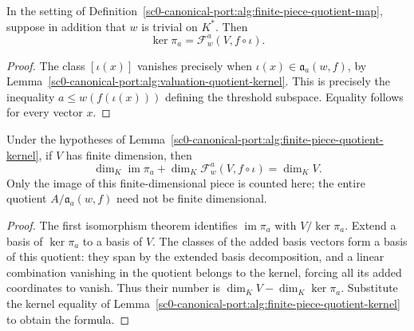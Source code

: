\begin{lemma}
\label{sc0-canonical-port:alg:finite-piece-quotient-kernel}
\leanok
In the setting of Definition~\ref{sc0-canonical-port:alg:finite-piece-quotient-map},
suppose in addition that \(w\) is trivial on \(K^*\). Then
\[
 \ker\pi_a=\mathcal F^a_w(V,f\circ\iota).
\]
\end{lemma}
\begin{proof}
The class \([\iota(x)]\) vanishes precisely when
\(\iota(x)\in\mathfrak a_a(w,f)\), by
Lemma~\ref{sc0-canonical-port:alg:valuation-quotient-kernel}. This is precisely the
inequality \(a\leq w(f(\iota(x)))\) defining the threshold
subspace. Equality follows for every vector \(x\).
\end{proof}

\begin{lemma}
\label{sc0-canonical-port:alg:finite-piece-rank-nullity}
\leanok
Under the hypotheses of Lemma~\ref{sc0-canonical-port:alg:finite-piece-quotient-kernel},
if \(V\) has finite dimension, then
\[
 \dim_K\operatorname{im}\pi_a
 +\dim_K\mathcal F^a_w(V,f\circ\iota)=\dim_K V.
\]
Only the image of this finite-dimensional piece is counted here;
the entire quotient \(A/\mathfrak a_a(w,f)\) need not be finite
 dimensional.
\end{lemma}
\begin{proof}
The first isomorphism theorem identifies
\(\operatorname{im}\pi_a\) with \(V/\ker\pi_a\).
Extend a basis of \(\ker\pi_a\) to a basis of \(V\).
The classes of the added basis vectors form a basis of this
quotient: they span by the extended basis decomposition, and a
linear combination vanishing in the quotient belongs to the kernel,
forcing all its added coordinates to vanish. Thus their number is
\(\dim_K V-\dim_K\ker\pi_a\). Substitute the kernel equality of
Lemma~\ref{sc0-canonical-port:alg:finite-piece-quotient-kernel} to obtain the formula.
\end{proof}

